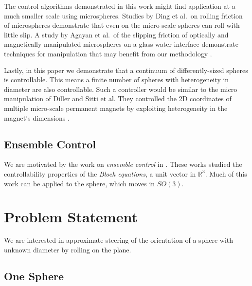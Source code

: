 \documentclass[letter paper, 10pt, conference]{ieeeconf}
\providecommand{\field}[1]{\mathbb{#1}}
\providecommand{\R}{\field{R}}
\begin{document}
   The control algorithms demonstrated in this work might find application at a much smaller scale using microspheres.  Studies by Ding et al.\ on rolling friction of microspheres \cite{DING2007} demonstrate that even on the micro-scale spheres can roll with little slip.  A study by Agayan et al.\ of the slipping friction of optically and magnetically manipulated microspheres on a glass-water interface demonstrate techniques for manipulation that may benefit from our methodology \cite{Agayan2008}.  
   
   Lastly, in this paper we demonstrate that a continuum of differently-sized spheres is controllable.  This means a finite number of spheres with heterogeneity in diameter are also controllable.   Such a controller would be similar to the micro manipulation of Diller and Sitti et al.  They  controlled the 2D coordinates of multiple micro-scale permanent magnets by exploiting heterogeneity in the magnet's dimensions \cite{Diller2012}.  

\subsection{Ensemble Control}
We are motivated by the work on \emph{ensemble control} in %
\cite{Brockett1999,Li2009,Beauchard2010a,Beauchard2010}.  These works studied the controllability properties of the \emph{Bloch equations}, a unit vector in $\R^3$.  Much of this work can be applied to the sphere, which moves in $SO(3)$.

\section{Problem Statement}\label{sec:ProblemStatement}
We  are interested in approximate steering of the orientation of a sphere with unknown diameter by rolling on the plane.
\subsection{One Sphere}
\end{document}
